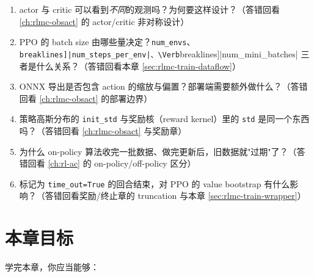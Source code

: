 \begin{practice}
\begin{enumerate}
  \item actor 与 critic 可以看到\emph{不同}的观测吗？为何要这样设计？（答错回看 \cref{ch:rlmc-obsact} 的 actor/critic 非对称设计）
  \item PPO 的 batch size 由哪些量决定？\verb|num_envs|、\Verb[breaklines]|num_steps_per_env|、\Verb[breaklines]|num_mini_batches| 三者是什么关系？（答错回看本章 \cref{sec:rlmc-train-dataflow}）
  \item ONNX 导出是否包含 action 的缩放与偏置？部署端需要额外做什么？（答错回看 \cref{ch:rlmc-obsact} 的部署边界）
  \item 策略高斯分布的 \verb|init_std| 与奖励核（reward kernel）里的 \verb|std| 是同一个东西吗？（答错回看 \cref{ch:rlmc-obsact} 与奖励章）
  \item 为什么 on-policy 算法收完一批数据、做完更新后，旧数据就"过期"了？（答错回看 \cref{ch:rl-ac} 的 on-policy/off-policy 区分）
  \item 标记为 \verb|time_out=True| 的回合结束，对 PPO 的 value bootstrap 有什么影响？（答错回看奖励/终止章的 truncation 与本章 \cref{sec:rlmc-train-wrapper}）
\end{enumerate}
\end{practice}

\section*{本章目标}
\label{sec:rlmc-train-goals}

学完本章，你应当能够：



